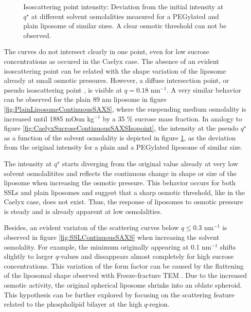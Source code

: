 \begin{figure}
	\centering
		
		\caption[Isoscattering point intensity of liposomes.]{Isoscattering point intensity: Deviation from the initial intensity at $q^{\star}$ at different solvent osmolalities measured for a PEGylated and plain liposome of similar sizes. A clear osmotic threshold can not be observed.}
		\label{fig:SSLIsopointIntensity}
\end{figure}

The curves do not intersect clearly in one point, even for low sucrose concentrations as occured in the Caelyx case. The absence of an evident isoscattering point can be related with the shape variation of the liposome already at small osmotic pressures. However, a diffuse intersection point, or pseudo isoscattering point \citep{kawaguchi_application_2004}, is visible at $q=0.18$ nm$^{-1}$. A very similar behavior can be observed for the plain 89 nm liposome in figure \ref{fig:PlainLiposomeContinuousSAXS}, where the suspending medium osmolality is increased until 1885 mOsm kg$^{-1}$ by a 35 $\%$ sucrose mass fraction. In analogy to figure \ref{fig:CaelyxSucroseContinuousSAXSIsopoint}, the intensity at the pseudo $q^{\star}$ as a function of the solvent osmolality is depicted in figure \ref{fig:SSLIsopointIntensity}, as the deviation from the original intensity for a plain and a PEGylated liposome of similar size.

The intensity at $q^{\star}$ starts diverging from the original value already at very low solvent osmolalitites and reflects the continuous change in shape or size of the liposome when increasing the osmotic pressure. This behavior occurs for both SSLs and plain liposomes and suggest that a sharp osmotic threshold, like in the Caelyx case, does not exist. Thus, the response of liposomes to osmotic pressure is steady and is already apparent at low osmolalities.

Besides, an evident variaton of the scattering curves below $q\leq0.3$ nm$^{-1}$ is observed in figure \ref{fig:SSLContinuousSAXS} when increasing the solvent osmolality. For example, the minimum originally appearing at 0.1 nm$^{-1}$ shifts slightly to larger $q$-values and dissappears almost completely for high sucrose concentrations. This variation of the form factor can be caused by the flattening of the liposomal shape observed with Freeze-fracture TEM \citep{varga_osmotic_2014}. Due to the increased osmotic activity, the original spherical liposome shrinks into an oblate spheroid. This hypothesis can be further explored by focusing on the scattering feature related to the phospholipid bilayer at the high $q$-region.


